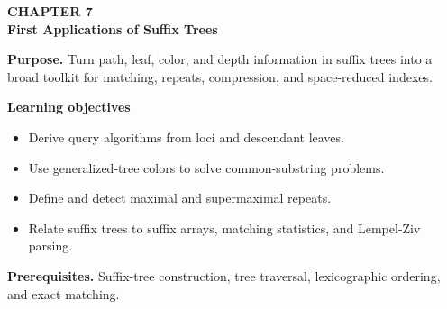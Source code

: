 \documentclass[11pt]{article}
\begin{document}
\begin{tcolorbox}[
  enhanced,breakable,colback=Primary!4,colframe=Primary,boxrule=0.9pt,
  arc=2mm,left=3mm,right=3mm,top=2.5mm,bottom=2.5mm]
{\sffamily\color{Accent}\bfseries CHAPTER 7}\\[-1pt]
{\sffamily\LARGE\bfseries\color{Primary} First Applications of Suffix Trees}

\vspace{2pt}
\textbf{Purpose.} Turn path, leaf, color, and depth information in suffix trees into a broad toolkit for matching, repeats, compression, and space-reduced indexes.

\textbf{Learning objectives}
\begin{itemize}
  \item Derive query algorithms from loci and descendant leaves.
  \item Use generalized-tree colors to solve common-substring problems.
  \item Define and detect maximal and supermaximal repeats.
  \item Relate suffix trees to suffix arrays, matching statistics, and Lempel-Ziv parsing.
\end{itemize}

\textbf{Prerequisites.} Suffix-tree construction, tree traversal, lexicographic ordering, and exact matching.
\end{tcolorbox}
\end{document}
